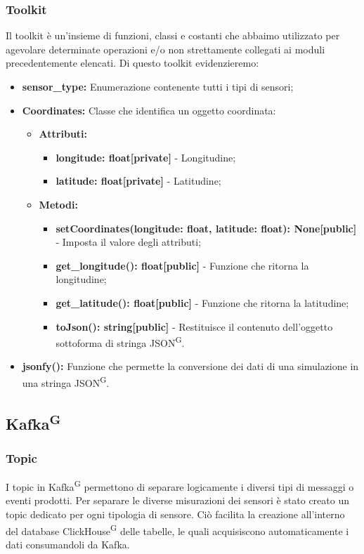\documentclass[8pt]{article}
\newcommand{\glossterm}[1]{#1\textsuperscript{G}} %
\begin{document}
\subsubsection{Toolkit}
Il toolkit è un'insieme di funzioni, classi e costanti che abbaimo utilizzato per agevolare determinate operazioni e/o non strettamente collegati ai moduli precedentemente elencati.
Di questo toolkit evidenzieremo:
\begin{itemize}
    \item \textbf{sensor\_type:} Enumerazione contenente tutti i tipi di sensori;
    \item \textbf{Coordinates:} Classe che identifica un oggetto coordinata:
    \begin{itemize}
        \item \textbf{Attributi:}
        \begin{itemize}
            \item \textbf{longitude: float[private]} - Longitudine;
            \item \textbf{latitude: float[private]} - Latitudine;
        \end{itemize}
        \item \textbf{Metodi:}
        \begin{itemize}
            \item \textbf{setCoordinates(longitude: float, latitude: float): None[public]} - Imposta il valore degli attributi;
            \item \textbf{get\_longitude(): float[public]} - Funzione che ritorna la longitudine;
            \item \textbf{get\_latitude(): float[public]} - Funzione che ritorna la latitudine;
            \item \textbf{toJson(): string[public]} - Restituisce il contenuto dell'oggetto sottoforma di stringa \glossterm{JSON}.
        \end{itemize}
    \end{itemize}
    \item \textbf{jsonfy():} Funzione che permette la conversione dei dati di una simulazione in una stringa \glossterm{JSON}.
\end{itemize}
\subsection{\glossterm{Kafka}}
\subsubsection{Topic}
I topic in \glossterm{Kafka} permettono di separare logicamente i diversi tipi di messaggi o eventi prodotti. Per separare le diverse misurazioni dei sensori è stato creato un topic dedicato per ogni tipologia di sensore.
Ciò facilita la creazione all’interno del database \glossterm{ClickHouse} delle tabelle, le quali acquisiscono automaticamente i dati consumandoli da Kafka.
\end{document}
